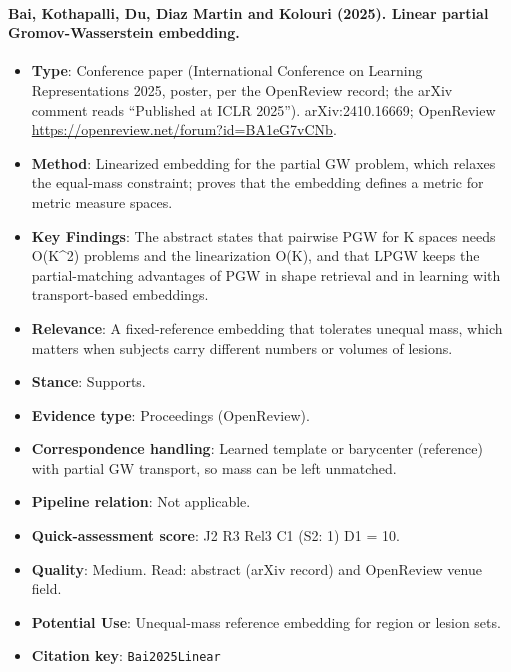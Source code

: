 \documentclass[journal,onecolumn]{IEEEtran}
\begin{document}
\paragraph{Bai, Kothapalli, Du, Diaz Martin and Kolouri (2025). Linear partial Gromov-Wasserstein embedding.~\cite{Bai2025Linear}}\mbox{}

\begin{itemize}

\item{} \textbf{Type}: Conference paper (International Conference on Learning Representations 2025, poster, per the OpenReview record; the arXiv comment reads ``Published at ICLR 2025''). arXiv:2410.16669; OpenReview \url{https://openreview.net/forum?id=BA1eG7vCNb}.

\item{} \textbf{Method}: Linearized embedding for the partial GW problem, which relaxes the equal-mass constraint; proves that the embedding defines a metric for metric measure spaces.

\item{} \textbf{Key Findings}: The abstract states that pairwise PGW for K spaces needs O(K\textasciicircum{}2) problems and the linearization O(K), and that LPGW keeps the partial-matching advantages of PGW in shape retrieval and in learning with transport-based embeddings.

\item{} \textbf{Relevance}: A fixed-reference embedding that tolerates unequal mass, which matters when subjects carry different numbers or volumes of lesions.

\item{} \textbf{Stance}: Supports.

\item{} \textbf{Evidence type}: Proceedings (OpenReview).

\item{} \textbf{Correspondence handling}: Learned template or barycenter (reference) with partial GW transport, so mass can be left unmatched.

\item{} \textbf{Pipeline relation}: Not applicable.

\item{} \textbf{Quick-assessment score}: J2 R3 Rel3 C1 (S2: 1) D1 = 10.

\item{} \textbf{Quality}: Medium. Read: abstract (arXiv record) and OpenReview venue field.

\item{} \textbf{Potential Use}: Unequal-mass reference embedding for region or lesion sets.

\item{} \textbf{Citation key}: \texttt{Bai2025Linear}

\end{itemize}
\end{document}
